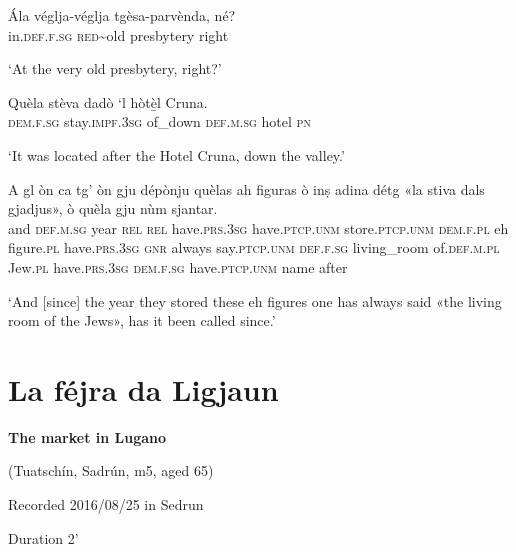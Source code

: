 \begin{linenumbers}
\gll  Ála véglja-véglja tgèsa-parvènda, né?  \\
 in.\textsc{def.f.sg} \textsc{red}\textasciitilde{old} presbytery right\\
\end{linenumbers}
\medskip
\glt `At the very old presbytery, right?'
\medskip

\begin{linenumbers}
\gll  Quèla stèva dadò `l hòtè̱l Cruna.  \\
 \textsc{dem.f.sg} stay.\textsc{impf.3sg} of\_down \textsc{def.m.sg} hotel \textsc{pn}\\
\end{linenumbers} 
\glt `It was located after the Hotel Cruna, down the valley.'
\medskip

\begin{linenumbers}
\gll A gl òn ca tg’ òn gju dépònju quèlas ah figuras ò inṣ adina détg «la stiva dals gjadjus», ò quèla gju nùm sjantar.   \\
and \textsc{def.m.sg} year \textsc{rel} \textsc{rel} have.\textsc{prs.3sg} have.\textsc{ptcp.unm} store.\textsc{ptcp.unm} \textsc{dem.f.pl} eh figure.\textsc{pl} have.\textsc{prs.3sg} \textsc{gnr} always say.\textsc{ptcp.unm} \textsc{def.f.sg} living\_room of.\textsc{def.m.pl} Jew.\textsc{pl} have.\textsc{prs.3sg} \textsc{dem.f.sg} have.\textsc{ptcp.unm} name after\\
\end{linenumbers}
\medskip
\glt `And [since] the year they stored these eh figures one has always said «the living room of the Jews», has it been called since.'
\medskip

\section{La féjra da Ligjaun} 

\noindent
\textbf{The market in Lugano}

\noindent
(Tuatschín, Sadrún, m5, aged 65)

\noindent
Recorded 2016/08/25 in Sedrun

\noindent
Duration 2'

\bigskip


